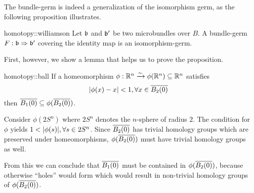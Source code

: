 \begin{myparagraph}
    The bundle-germ is indeed a generalization of the isomorphism germ, as the following proposition illustrates.
\end{myparagraph}

\begin{myproposition}[Williamson]{homotopy::williamson}
    Let $\mathfrak{b}$ and $\mathfrak{b}'$ be two microbundles over $B$.
    A bundle-germ $F: \mathfrak{b} \Rightarrow{} \mathfrak{b}'$ covering the identity map is an isomorphism-germ.
\end{myproposition}

\begin{myparagraph}
    First, however, we show a lemma that helps us to prove the proposition.
\end{myparagraph}

\begin{mylemma}{homotopy::ball}
    If a homeomorphism $\phi: \mathbb{R}^n \xrightarrow{\sim} \phi(\mathbb{R}^n) \subseteq{} \mathbb{R}^n$ satisfies
    \[ \abs{\phi(x) - x} < 1, \forall x \in \clball[2] \]
    then $\clball[1] \sub \phi(\clball[2])$.
\end{mylemma}

\begin{myproof}
    Consider $\phi(2S^n)$ where $2S^n$ denotes the $n$-sphere of radius $2$.
    The condition for $\phi$ yields $1 < \vert{} \phi(s) \vert{}, \forall s \in 2S^n$.
    Since $\clball[2]$ has trivial homology groups which are preserved under homeomorphisms,
    $\phi(\clball[2])$ must have trivial homology groups as well.

    From this we can conclude that $\clball[1]$ must be contained in $\phi(\clball[2])$,
    because otherwise ``holes'' would form which would result in non-trivial homology groups of $\phi(\clball[2])$.
\end{myproof}


